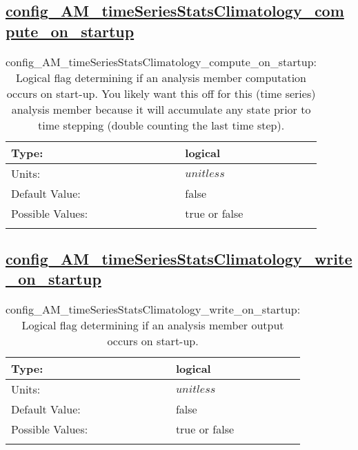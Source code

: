 \subsection[config\_AM\_timeSeriesStatsClimatology\_compute\_on\_startup]{\hyperref[sec:nm_tab_AM_timeSeriesStatsClimatology]{config\_AM\_timeSeriesStatsClimatology\_compute\_on\_startup}}
\label{subsec:nm_sec_config_AM_timeSeriesStatsClimatology_compute_on_startup}
\begin{center}
\begin{longtable}{| p{2.0in} || p{4.0in} |}
    \hline
    Type: & logical \\
    \hline
    Units: & $unitless$ \\
    \hline
    Default Value: & false \\
    \hline
    Possible Values: & true or false \\
    \hline
    \caption{config\_AM\_timeSeriesStatsClimatology\_compute\_on\_startup: Logical flag determining if an analysis member computation occurs on start-up. You likely want this off for this (time series) analysis member because it will accumulate any state prior to time stepping (double counting the last time step).}
\end{longtable}
\end{center}
\subsection[config\_AM\_timeSeriesStatsClimatology\_write\_on\_startup]{\hyperref[sec:nm_tab_AM_timeSeriesStatsClimatology]{config\_AM\_timeSeriesStatsClimatology\_write\_on\_startup}}
\label{subsec:nm_sec_config_AM_timeSeriesStatsClimatology_write_on_startup}
\begin{center}
\begin{longtable}{| p{2.0in} || p{4.0in} |}
    \hline
    Type: & logical \\
    \hline
    Units: & $unitless$ \\
    \hline
    Default Value: & false \\
    \hline
    Possible Values: & true or false \\
    \hline
    \caption{config\_AM\_timeSeriesStatsClimatology\_write\_on\_startup: Logical flag determining if an analysis member output occurs on start-up.}
\end{longtable}
\end{center}
